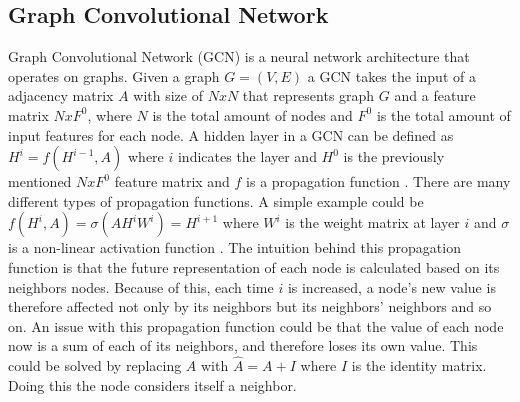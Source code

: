\subsection{Graph Convolutional Network}
Graph Convolutional Network (GCN) is a neural network architecture that operates on graphs.
Given a graph $G = (V,E)$ a GCN takes the input of a adjacency
matrix $A$ with size of $N x N$ that represents graph $G$ and a feature matrix $N x F^0$, where $N$ is the total amount of nodes and $F^0$ is the total amount of input features for each node.
A hidden layer in a GCN can be defined as $H^i = f(H^{i-1}, A)$ where $i$ indicates the layer and $H^0$ is the previously mentioned $N x F^0$ feature matrix and $f$ is a propagation function \cite{Deep-Learning-on-Graphs-with-GCN}.
There are many different types of propagation functions.
A simple example could be $f(H^i, A) = \sigma(AH^iW^i) = H^{i+1}$ where $W^i$ is the weight matrix at layer $i$ and $\sigma$ is a non-linear activation function \cite{Deep-Learning-on-Graphs-with-GCN}.
The intuition behind this propagation function is that the future representation of each node is calculated based on its neighbors nodes.
Because of this, each time $i$ is increased, a node's new value is therefore affected not only by its neighbors but its neighbors' neighbors and so on.
An issue with this propagation function could be that the value of each node now is a sum of each of its neighbors, and therefore loses its own value.
This could be solved by replacing $A$ with $\hat{A} = A + I$ where $I$ is the identity matrix.
Doing this the node considers itself a neighbor.

